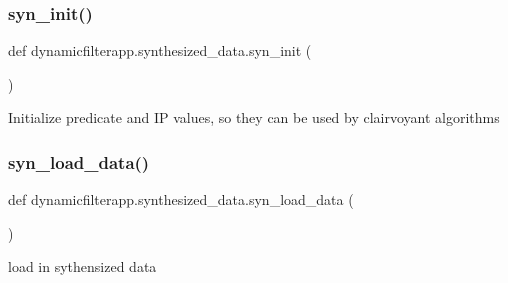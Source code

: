 \subsubsection{\texorpdfstring{syn\+\_\+init()}{syn\_init()}}
{\footnotesize\ttfamily def dynamicfilterapp.\+synthesized\+\_\+data.\+syn\+\_\+init (\begin{DoxyParamCaption}{ }\end{DoxyParamCaption})}

\begin{DoxyVerb}Initialize predicate and IP values, so they can be used by clairvoyant algorithms
\end{DoxyVerb}
 \mbox{\label{namespacedynamicfilterapp_1_1synthesized__data_af2a5ccfeb2728fbcc461071a4755b1c9}} 
\subsubsection{\texorpdfstring{syn\+\_\+load\+\_\+data()}{syn\_load\_data()}}
{\footnotesize\ttfamily def dynamicfilterapp.\+synthesized\+\_\+data.\+syn\+\_\+load\+\_\+data (\begin{DoxyParamCaption}{ }\end{DoxyParamCaption})}

\begin{DoxyVerb}load in sythensized data
\end{DoxyVerb}
 